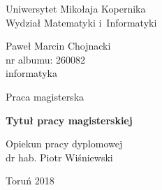 \documentclass[a4paper,twoside,titlepage,openright]{book}
\begin{document}

\begin{titlepage}


\vspace*{1cm}
\begin{center}
\begin{Large}
Uniwersytet Mikołaja Kopernika\\[1mm]
Wydział Matematyki i~Informatyki\\[1mm]
\end{Large}
\end{center}

\vfill

\begin{center}
{\Large Paweł Marcin Chojnacki}\\
nr albumu: 260082\\
informatyka
\end{center}

\vfill

\begin{center}
{\Large Praca magisterska}
\end{center}

\vspace{0.5cm}

\begin{center}
{\Huge \textbf{Tytuł pracy magisterskiej}}
\end{center}

\vspace{2cm}
\hfill
\begin{minipage}{6.5cm}
Opiekun pracy dyplomowej\\
dr hab. Piotr Wiśniewski
\end{minipage}

\vfill

\begin{center}
Toruń 2018
\end{center}

\end{titlepage}

\clearpage{\pagestyle{empty}\cleardoublepage}

\tableofcontents
\end{document}
